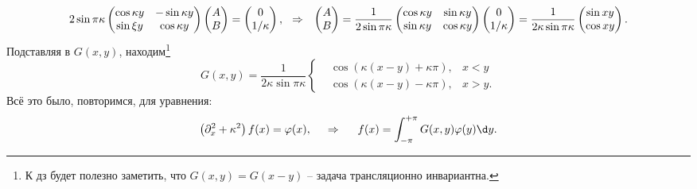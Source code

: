 \begin{equation*}
    2 \sin \pi \kappa 
    \begin{pmatrix}
        \cos \kappa y & - \sin \kappa y  \\
        \sin \xi y & \cos \kappa y  \\
    \end{pmatrix} \begin{pmatrix}
        A  \\
        B  \\
    \end{pmatrix}
    = \begin{pmatrix}
        0 \\ 1/\kappa
    \end{pmatrix},
    \hspace{0.25cm} \Rightarrow \hspace{0.25cm}
    \begin{pmatrix}
        A \\ B
    \end{pmatrix} = 
    \frac{1}{2 \sin \pi \kappa} \begin{pmatrix}
        \cos \kappa y & \sin \kappa y  \\
        \sin \kappa y & \cos \kappa y  \\
    \end{pmatrix}
    \begin{pmatrix}
        0 \\ 1/\kappa
    \end{pmatrix} = 
    \frac{1}{2 \kappa \sin \pi \kappa} \begin{pmatrix}
        \sin xy \\ \cos xy
    \end{pmatrix}.
\end{equation*}
Подставляя в $G(x, y)$, находим\footnote{
    К дз будет полезно заметить, что $G(x, y) = G(x-y)$ -- задача трансляционно инвариантна. 
} 
\begin{equation*}
    G(x, y) = \frac{1}{2 \kappa \sin \pi \kappa}
    \left\{\begin{aligned}
        &\cos \left(\kappa(x-y) + \kappa \pi\right), & x < y\\
        &\cos(\kappa (x-y) - \kappa \pi), & x > y.
    \end{aligned}\right.
\end{equation*}
Всё это было, повторимся, для уравнения:
\begin{equation*}
    \left(\partial_x^2 + \kappa^2\right) f(x) = \varphi(x),
    \hspace{0.5cm} \Rightarrow \hspace{0.5cm}   
    f(x) = 
    \int_{-\pi}^{+\pi} G(x, y) \varphi(y) \d y. 
\end{equation*}








